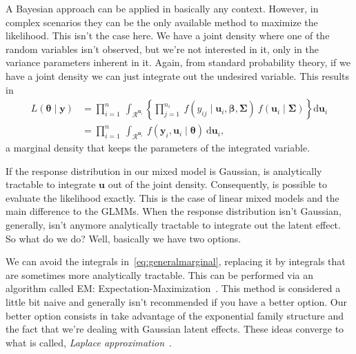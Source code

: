 A Bayesian approach can be applied in basically any context. However, in
complex scenarios they can be the only available method to maximize the
likelihood. This isn't the case here. We have a joint density where one
of the random variables isn't observed, but we're not interested in it,
only in the variance parameters inherent in it. Again, from standard
probability theory, if we have a joint density we can just integrate out
the undesired variable. This results in
\begin{equation}
  \begin{aligned}
    L(\bm{\theta} \mid \mathbf{y}) &=
    \prod_{i=1}^{n}~\int_{\mathcal{R}^{\mathbf{u}_{i}}}
    \left\{
      \prod_{j=1}^{n_{i}}~
      f(y_{ij} \mid \mathbf{u}_{i}, \bm{\beta}, \bm{\Sigma})~
      f(\mathbf{u}_{i} \mid \bm{\Sigma})
    \right\} \text{d} \mathbf{u}_{i}\\
    &= \prod_{i=1}^{n}~\int_{\mathcal{R}^{\mathbf{u}_{i}}}~
    f(\mathbf{y}_{i}, \mathbf{u}_{i} \mid \bm{\theta})~
    \text{d} \mathbf{u}_{i},
    \label{eq:generalmarginal}
  \end{aligned}
\end{equation}
a marginal density that keeps the parameters of the integrated variable.

If the response distribution in our mixed model is Gaussian, is
analytically tractable to integrate \(\mathbf{u}\) out of the joint
density. Consequently, is possible to evaluate the likelihood exactly.
This is the case of linear mixed models and the main difference to the
GLMMs. When the response distribution isn't Gaussian, generally, isn't
anymore analytically tractable to integrate out the latent effect. So
what do we do? Well, basically we have two options.

We can avoid the integrals in~\autoref{eq:generalmarginal}, replacing it
by integrals that are sometimes more analytically tractable. This can be
performed via an algorithm called EM:
Expectation-Maximization~\cite{EM77}. This method is considered a little
bit naive and generally isn't recommended if you have a better option.
Our better option consists in take advantage of the exponential family
structure and the fact that we're dealing with Gaussian latent effects.
These ideas converge to what is called, \textit{Laplace
  approximation}~\cite{molenberghs&verbeke, LA4H, tierney, corestats}.

